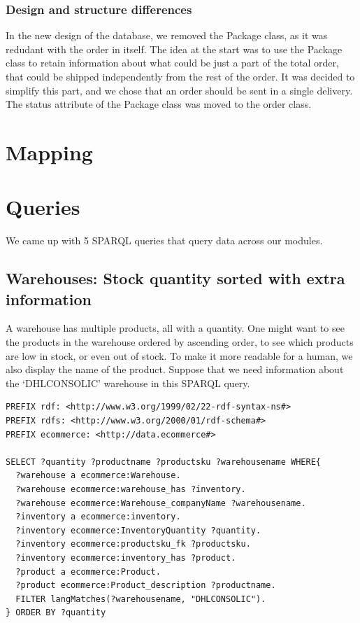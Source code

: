 \documentclass{article}
\begin{document}
\subsubsection{Design and structure differences}
In the new design of the database, we removed the Package class, as it was redudant with the order in itself. The idea at the start was to use the Package class to retain information about what could be just a part of the total order, that could be shipped independently from the rest of the order. It was decided to simplify this part, and we chose that an order should be sent in a single delivery. The status attribute of the Package class was moved to the order class.

\section{Mapping}


\section{Queries}
We came up with 5 SPARQL queries that query data across our modules.





\subsection{Warehouses: Stock quantity sorted with extra information}
A warehouse has multiple products, all with a quantity. One might want to see the products in the warehouse ordered by ascending order, to see which products are low in stock, or even out of stock. To make it more readable for a human, we also display the name of the product. Suppose that we need information about the `DHLCONSOLIC' warehouse in this SPARQL query.

\begin{lstlisting}[breaklines, frame=single]
PREFIX rdf: <http://www.w3.org/1999/02/22-rdf-syntax-ns#>
PREFIX rdfs: <http://www.w3.org/2000/01/rdf-schema#>
PREFIX ecommerce: <http://data.ecommerce#>

SELECT ?quantity ?productname ?productsku ?warehousename WHERE{
  ?warehouse a ecommerce:Warehouse.
  ?warehouse ecommerce:warehouse_has ?inventory.
  ?warehouse ecommerce:Warehouse_companyName ?warehousename.
  ?inventory a ecommerce:inventory.
  ?inventory ecommerce:InventoryQuantity ?quantity.
  ?inventory ecommerce:productsku_fk ?productsku.
  ?inventory ecommerce:inventory_has ?product.
  ?product a ecommerce:Product.
  ?product ecommerce:Product_description ?productname.
  FILTER langMatches(?warehousename, "DHLCONSOLIC").
} ORDER BY ?quantity
\end{lstlisting}
\end{document}
